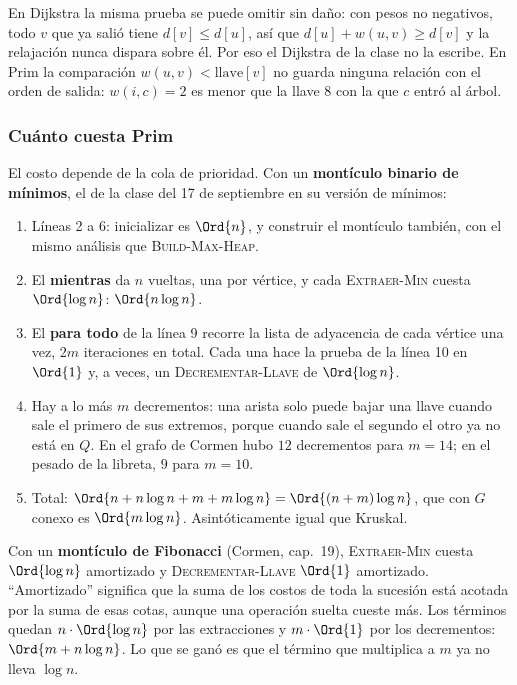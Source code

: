 \documentclass[11pt,letterpaper]{article}
\begin{document}
En Dijkstra la misma prueba se puede omitir sin daño: con pesos no
negativos, todo $v$ que ya salió tiene $d[v] \le d[u]$, así que
$d[u] + w(u, v) \ge d[v]$ y la relajación nunca dispara sobre él. Por
eso el Dijkstra de la clase no la escribe. En Prim la comparación
$w(u, v) < \text{llave}[v]$ no guarda ninguna relación con el orden de
salida: $w(i, c) = 2$ es menor que la llave $8$ con la que $c$ entró
al árbol.

\subsubsection*{Cuánto cuesta Prim}

El costo depende de la cola de prioridad. Con un \textbf{montículo
binario de mínimos}, el de la clase del 17 de septiembre en su versión
de mínimos:
\begin{enumerate}[itemsep=0.1em]
  \item Líneas 2 a 6: inicializar es $\Ord{n}$, y construir el
        montículo también, con el mismo análisis que
        \textsc{Build-Max-Heap}.
  \item El \textbf{mientras} da $n$ vueltas, una por vértice, y cada
        \textsc{Extraer-Min} cuesta $\Ord{\log n}$: $\Ord{n \log n}$.
  \item El \textbf{para todo} de la línea 9 recorre la lista de
        adyacencia de cada vértice una vez, $2m$ iteraciones en total.
        Cada una hace la prueba de la línea 10 en $\Ord{1}$ y, a veces,
        un \textsc{Decrementar-Llave} de $\Ord{\log n}$.
  \item Hay a lo más $m$ decrementos: una arista solo puede bajar una
        llave cuando sale el primero de sus extremos, porque cuando
        sale el segundo el otro ya no está en $Q$. En el grafo de
        Cormen hubo $12$ decrementos para $m = 14$; en el pesado de la
        libreta, $9$ para $m = 10$.
  \item Total: $\Ord{n + n \log n + m + m \log n} = \Ord{(n + m) \log n}$,
        que con $G$ conexo es $\Ord{m \log n}$. Asintóticamente igual
        que Kruskal.
\end{enumerate}

Con un \textbf{montículo de Fibonacci} (Cormen, cap.\ 19),
\textsc{Extraer-Min} cuesta $\Ord{\log n}$ amortizado y
\textsc{Decrementar-Llave} $\Ord{1}$ amortizado. ``Amortizado''
significa que la suma de los costos de toda la sucesión está acotada
por la suma de esas cotas, aunque una operación suelta cueste más. Los
términos quedan $n \cdot \Ord{\log n}$ por las extracciones y
$m \cdot \Ord{1}$ por los decrementos: $\Ord{m + n \log n}$. Lo que se
ganó es que el término que multiplica a $m$ ya no lleva $\log n$.
\end{document}
